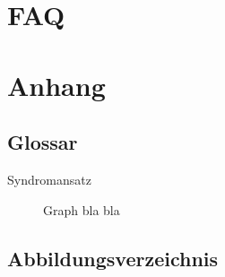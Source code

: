 \documentclass[enabledeprecatedfontcommands,fontsize=11pt,paper=a4,twoside]{scrartcl}
\begin{document}
	
	
	
\section{FAQ}
\newpage
\section{Anhang} \label{sec:anhang}	
	\subsection{Glossar}
	
	\begin{description}
		\item[Syndromansatz] Graph bla bla
	\end{description}
	
	\subsection{Abbildungsverzeichnis}
	\listoffigures
	

\newpage



\end{document}
